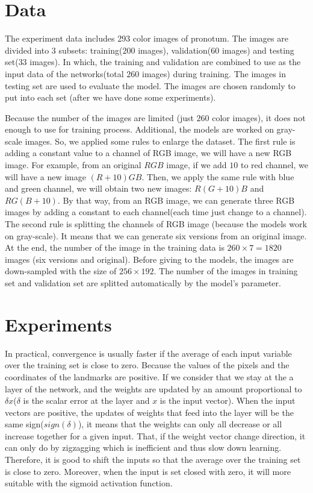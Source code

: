 \documentclass[12pt,a4paper]{article}
\begin{document}
\section{Data}
\label{sectionData}
The experiment data includes 293 color images of pronotum. The images are divided into 3 subsets: training($200$ images), validation($60$ images) and testing set($33$ images). In which, the training and validation are combined to use as the input data of the networks(total $260$ images) during training. The images in testing set are used to evaluate the model. The images are chosen randomly to put into each set (after we have done some experiments).

Because the number of the images are limited (just $260$ color images), it does not enough to use for training process. Additional, the models are worked on gray-scale images. So, we applied some rules to enlarge the dataset. The first rule is adding a constant value to a channel of RGB image, we will have a new RGB image. For example, from an original $RGB$ image, if we add $10$ to red channel, we will have a new image $(R+10)GB$. Then, we apply the same rule with blue and green channel, we will obtain two new images: $R(G+10)B$ and $RG(B+10)$. By that way, from an RGB image, we can generate three RGB images by adding a constant to each channel(each time just change to a channel). The second rule is splitting the channels of RGB image (because the models work on gray-scale). It means that we can generate six versions from an original image. At the end, the number of the image in the training data is $ 260 \times 7 = 1820$ images (six versions and original). Before giving to the models, the images are down-sampled with the size of $256 \times 192$. The number of the images in training set and validation set are splitted automatically by the model's parameter.
\section{Experiments}
In practical, convergence is usually faster if the average of each input variable over the training set is close to zero. Because the values of the pixels and the coordinates of the landmarks are positive. If we consider that we stay at the a layer of the network, and the weights are updated by an amount proportional to $\delta x$($\delta$ is the scalar error at the layer and $x$ is the input vector). When the input vectors are positive, the updates of weights that feed into the layer will be the same sign($sign(\delta)$), it means that the weights can only all decrease or all increase together for a given input. That, if the weight vector change direction, it can only do by zigzagging which is inefficient and thus slow down learning. Therefore, it is good to shift the inputs so that the average over the training set is close to zero. Moreover, when the input is set closed with zero, it will more suitable with the sigmoid activation function\cite{lecun2012efficient}.
 
\end{document}
